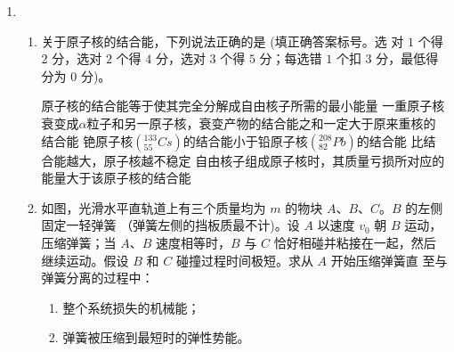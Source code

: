 \begin{enumerate}
\item 
{}
\begin{enumerate}
	\item
关于原子核的结合能，下列说法正确的是 \underlinegap (填正确答案标号。选
对 $ 1 $ 个得 $ 2 $ 分，选对 $ 2 $ 个得 $ 4 $ 分，选对 $ 3 $ 个得 $ 5 $ 分；每选错 $ 1 $ 个扣 $ 3 $ 分，最低得分为 $ 0 $ 分)。

\fivechoices
{原子核的结合能等于使其完全分解成自由核子所需的最小能量}
{一重原子核衰变成$ \alpha $粒子和另一原子核，衰变产物的结合能之和一定大于原来重核的结合能}
{铯原子核$(^{133}_{55}Cs) $的结合能小于铅原子核$ (^{208}_{82}Pb) $的结合能}
{比结合能越大，原子核越不稳定}
{自由核子组成原子核时，其质量亏损所对应的能量大于该原子核的结合能}



\item 
如图，光滑水平直轨道上有三个质量均为 $ m $ 的物块 $ A $、$ B $、$ C $。$ B $ 的左侧固定一轻弹簧
（弹簧左侧的挡板质最不计)。设 $ A $ 以速度 $ v_{0} $ 朝 $ B $ 运动，压缩弹簧；当 $ A $、$ B $ 速度相等时，$ B $ 与 $ C $
恰好相碰并粘接在一起，然后继续运动。假设 $ B $
和 $ C $ 碰撞过程时间极短。求从 $ A $ 开始压缩弹簧直
至与弹簧分离的过程中：
\begin{enumerate}
	\item
整个系统损失的机械能；
\item 
弹簧被压缩到最短时的弹性势能。
	
\end{enumerate}
\begin{figure}[h!]
	\flushright
	
\end{figure}




\end{enumerate}
\end{enumerate}
